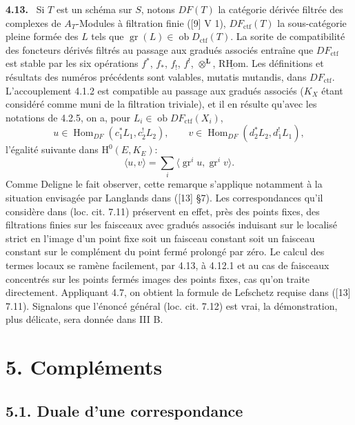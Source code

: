 \documentclass[11pt]{article}
\newenvironment{statement}[1]{\par\medskip\noindent\textbf{#1.}\ }{\par\medskip}
\renewcommand{\H}{\mathrm{H}}
\DeclareMathOperator{\Hom}{Hom}
\newcommand{\R}{\mathrm{R}}\newcommand{\RHomCore}{\mathrm{RHom}}
\newcommand{\ob}{\operatorname{ob}}
\providecommand{\RHom}{\RHomCore}
\providecommand{\uRHom}{\underline{\RHom}}
\providecommand{\Dctf}{D_{\mathrm{ctf}}}
\providecommand{\ctf}{\mathrm{ctf}}
\providecommand{\gr}{\operatorname{gr}}
\providecommand{\Dctf}{D_{\mathrm{ctf}}}
\providecommand{\RHom}{\RHomCore}
\providecommand{\Hom}{\operatorname{Hom}}
\providecommand{\ob}{\operatorname{ob}}
\providecommand{\gr}{\operatorname{gr}}
\providecommand{\gr}{\operatorname{gr}}
\providecommand{\RHom}{\R\mathcal{H}om}
\providecommand{\R}{\mathrm R}
\providecommand{\RHom}{\RHomCore}
\providecommand{\Hom}{\operatorname{Hom}}
\begin{document}
\begin{statement}{4.13}
Si $T$ est un schéma sur $S$, notons $DF(T)$ la catégorie dérivée filtrée des complexes de $A_T$-Modules à filtration finie ([9] V 1), $DF_{\ctf}(T)$ la sous-catégorie pleine formée des $L$ tels que $\gr(L)\in\ob\Dctf(T)$. La sorite de compatibilité des foncteurs dérivés filtrés au passage aux gradués associés entraîne que $DF_{\ctf}$ est stable par les six opérations $f^*$, $f_*$, $f_!$, $f^!$, $\otimes^{\mathbf L}$, $\uRHom$. Les définitions et résultats des numéros précédents sont valables, mutatis mutandis, dans $DF_{\ctf}$. L'accouplement 4.1.2 est compatible au passage aux gradués associés ($K_X$ étant considéré comme muni de la filtration triviale), et il en résulte qu'avec les notations de 4.2.5, on a, pour $L_i\in\ob DF_{\ctf}(X_i)$,
\[
u\in\Hom_{DF}(c_1^*L_1,c_2^!L_2),\qquad
v\in\Hom_{DF}(d_2^*L_2,d_1^!L_1),
\]
l'égalité suivante dans $\H^0(E,K_E)$:
\begin{equation}
\tag{4.13.1}
\langle u,v\rangle=\sum_i\langle \gr^i u,\gr^i v\rangle.
\end{equation}
Comme Deligne le fait observer, cette remarque s'applique notamment à la situation envisagée par Langlands dans ([13] §7). Les correspondances qu'il considère dans (loc. cit. 7.11) préservent en effet, près des points fixes, des filtrations finies sur les faisceaux avec gradués associés induisant sur le localisé strict en l'image d'un point fixe soit un faisceau constant soit un faisceau constant sur le complément du point fermé prolongé par zéro. Le calcul des termes locaux se ramène facilement, par 4.13, à 4.12.1 et au cas de faisceaux concentrés sur les points fermés images des points fixes, cas qu'on traite directement. Appliquant 4.7, on obtient la formule de Lefschetz requise dans ([13] 7.11). Signalons que l'énoncé général (loc. cit. 7.12) est vrai, la démonstration, plus délicate, sera donnée dans III B.
\end{statement}



\section*{5. Compléments}

\subsection*{5.1. Duale d'une correspondance}
\end{document}
